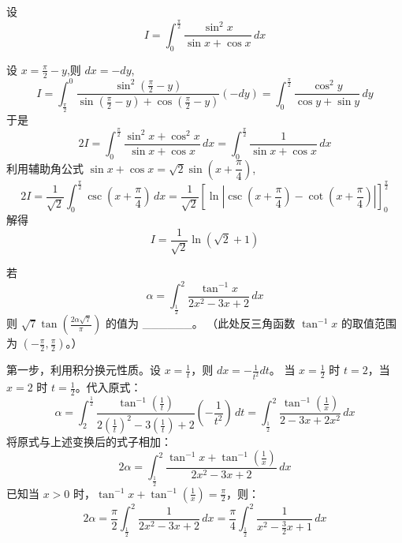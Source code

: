 \begin{questions}
    \question 设
    \[
    I = \int_{0}^{\frac{\pi}{2}} \frac{\sin^2 x}{\sin x + \cos x} \, dx
    \]
    \begin{solution}
        设 $x = \frac{\pi}{2} - y$,则 $dx = -dy$,
        \[
        I = \int_{\frac{\pi}{2}}^{0} \frac{\sin^2(\frac{\pi}{2}-y)}{\sin(\frac{\pi}{2}-y) + \cos(\frac{\pi}{2}-y)} (-dy) = \int_{0}^{\frac{\pi}{2}} \frac{\cos^2 y}{\cos y + \sin y} \, dy
        \]
        于是
        \[
        2I = \int_{0}^{\frac{\pi}{2}} \frac{\sin^2 x + \cos^2 x}{\sin x + \cos x} \, dx = \int_{0}^{\frac{\pi}{2}} \frac{1}{\sin x + \cos x} \, dx
        \]
        利用辅助角公式 $\sin x + \cos x = \sqrt{2}\sin\left(x + \dfrac{\pi}{4}\right)$,
        \[
        2I = \frac{1}{\sqrt{2}} \int_{0}^{\frac{\pi}{2}} \csc\left(x + \frac{\pi}{4}\right) \, dx = \frac{1}{\sqrt{2}} \left[ \ln\left| \csc\left(x + \frac{\pi}{4}\right) - \cot\left(x + \frac{\pi}{4}\right) \right| \right]_{0}^{\frac{\pi}{2}}
        \]
        解得
        \[
        I = \frac{1}{\sqrt{2}} \ln(\sqrt{2}+1)
        \]
    \end{solution}

    \question
若
\[
\alpha = \int_{\frac{1}{2}}^{2} \frac{\tan^{-1} x}{2x^2 - 3x + 2} \,dx
\]
则 $\sqrt{7} \tan\left(\frac{2\alpha\sqrt{7}}{\pi}\right)$ 的值为 \_\_\_\_\_\_。
（此处反三角函数 $\tan^{-1} x$ 的取值范围为 $(-\frac{\pi}{2}, \frac{\pi}{2})$。）

\begin{solution}
第一步，利用积分换元性质。设 $x = \frac{1}{t}$，则 $dx = -\frac{1}{t^2} dt$。
当 $x = \frac{1}{2}$ 时 $t = 2$，当 $x = 2$ 时 $t = \frac{1}{2}$。代入原式：
\[
\alpha = \int_{2}^{\frac{1}{2}} \frac{\tan^{-1}(\frac{1}{t})}{2(\frac{1}{t})^2 - 3(\frac{1}{t}) + 2} \left( -\frac{1}{t^2} \right) \,dt = \int_{\frac{1}{2}}^{2} \frac{\tan^{-1}(\frac{1}{x})}{2 - 3x + 2x^2} \,dx
\]
将原式与上述变换后的式子相加：
\[
2\alpha = \int_{\frac{1}{2}}^{2} \frac{\tan^{-1} x + \tan^{-1}(\frac{1}{x})}{2x^2 - 3x + 2} \,dx
\]
已知当 $x > 0$ 时，$\tan^{-1} x + \tan^{-1}(\frac{1}{x}) = \frac{\pi}{2}$，则：
\[
2\alpha = \frac{\pi}{2} \int_{\frac{1}{2}}^{2} \frac{1}{2x^2 - 3x + 2} \,dx = \frac{\pi}{4} \int_{\frac{1}{2}}^{2} \frac{1}{x^2 - \frac{3}{2}x + 1} \,dx
\]


\end{solution}
\end{questions}
